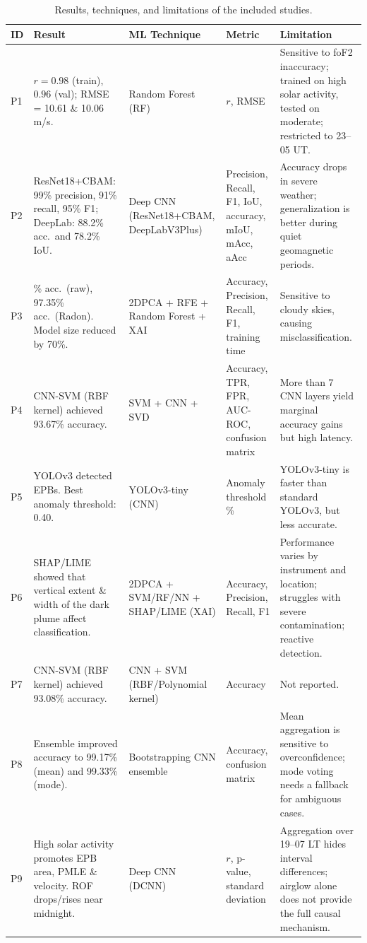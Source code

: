 \begin{table}[ht!]
\caption{Results, techniques, and limitations of the included studies.}
\label{tab:results-techniques}
\centering
\tiny
\setlength{\tabcolsep}{2pt}
\renewcommand{\arraystretch}{1.05}
\begin{tabular}{@{}>{\raggedright\arraybackslash}p{}>{\raggedright\arraybackslash}p{}>{\raggedright\arraybackslash}p{}>{\raggedright\arraybackslash}p{}>{\raggedright\arraybackslash}p{}@{}}
\hline
\textbf{ID} & \textbf{Result} & \textbf{ML Technique} & \textbf{Metric} & \textbf{Limitation} \\
\hline
P1 & $r = 0.98$ (train), $0.96$ (val); RMSE = 10.61 \& 10.06 m/s. & Random Forest (RF) & $r$, RMSE & Sensitive to foF2 inaccuracy; trained on high solar activity, tested on moderate; restricted to 23--05 UT. \\
P2 & ResNet18+CBAM: 99\% precision, 91\% recall, 95\% F1; DeepLab: 88.2\% acc.\ and 78.2\% IoU. & Deep CNN (ResNet18+CBAM, DeepLabV3Plus) & Precision, Recall, F1, IoU, accuracy, mIoU, mAcc, aAcc & Accuracy drops in severe weather; generalization is better during quiet geomagnetic periods. \\
P3 & 98.17\% acc.\ (raw), 97.35\% acc.\ (Radon). Model size reduced by 70\%. & 2DPCA + RFE + Random Forest + XAI & Accuracy, Precision, Recall, F1, training time & Sensitive to cloudy skies, causing misclassification. \\
P4 & CNN-SVM (RBF kernel) achieved 93.67\% accuracy. & SVM + CNN + SVD & Accuracy, TPR, FPR, AUC-ROC, confusion matrix & More than $7$ CNN layers yield marginal accuracy gains but high latency. \\
P5 & YOLOv3 detected EPBs. Best anomaly threshold: 0.40. & YOLOv3-tiny (CNN) & Anomaly threshold \% & YOLOv3-tiny is faster than standard YOLOv3, but less accurate. \\
P6 & SHAP/LIME showed that vertical extent \& width of the dark plume affect classification. & 2DPCA + SVM/RF/NN + SHAP/LIME (XAI) & Accuracy, Precision, Recall, F1 & Performance varies by instrument and location; struggles with severe contamination; reactive detection. \\
P7 & CNN-SVM (RBF kernel) achieved 93.08\% accuracy. & CNN + SVM (RBF/Polynomial kernel) & Accuracy & Not reported. \\
P8 & Ensemble improved accuracy to 99.17\% (mean) and 99.33\% (mode). & Bootstrapping CNN ensemble & Accuracy, confusion matrix & Mean aggregation is sensitive to overconfidence; mode voting needs a fallback for ambiguous cases. \\
P9 & High solar activity promotes EPB area, PMLE \& velocity. ROF drops/rises near midnight. & Deep CNN (DCNN) & $r$, p-value, standard deviation & Aggregation over 19--07 LT hides interval differences; airglow alone does not provide the full causal mechanism. \\
\hline
\end{tabular}
\end{table}


